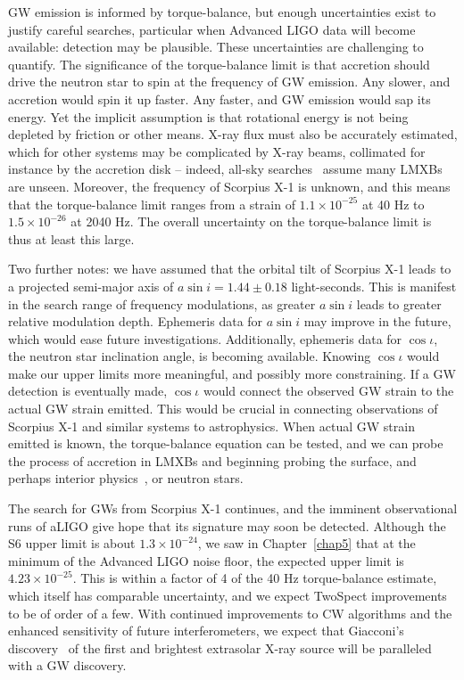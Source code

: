 GW emission is informed by torque-balance, but enough uncertainties exist to justify careful searches, particular when Advanced LIGO data will become available: detection may be plausible.
These uncertainties are challenging to quantify.
The significance of the torque-balance limit is that accretion should drive the neutron star to spin at the frequency of GW emission.
Any slower, and accretion would spin it up faster.
Any faster, and GW emission would sap its energy.
Yet the implicit assumption is that rotational energy is not being depleted by friction or other means.
X-ray flux must also be accurately estimated, which for other systems may be complicated by X-ray beams, collimated for instance by the accretion disk -- indeed, all-sky searches~\cite{GoetzTwoSpectResults2014} assume many LMXBs are unseen.
Moreover, the frequency of Scorpius X-1 is unknown, and this means that the torque-balance limit ranges from a strain of $1.1\times10^{-25}$ at 40 Hz to $1.5\times10^{-26}$ at 2040 Hz.
The overall uncertainty on the torque-balance limit is thus at least this large.

Two further notes: we have assumed that the orbital tilt of Scorpius X-1 leads to a projected semi-major axis of $a \sin i = 1.44 \pm 0.18$ light-seconds.
This is manifest in the search range of frequency modulations, as greater $a \sin i$ leads to greater relative modulation depth.
Ephemeris data for $a \sin i$ may improve in the future, which would ease future investigations.
Additionally, ephemeris data for $\cos \iota$, the neutron star inclination angle, is becoming available.
Knowing $\cos \iota$ would make our upper limits more meaningful, and possibly more constraining.
If a GW detection is eventually made, $\cos \iota$ would connect the observed GW strain to the actual GW strain emitted.
This would be crucial in connecting observations of Scorpius X-1 and similar systems to astrophysics.
When actual GW strain emitted is known, the torque-balance equation can be tested, and we can probe the process of accretion in LMXBs and beginning probing the surface, and perhaps interior physics~\cite{Lindblom1995}, or neutron stars.

The search for GWs from Scorpius X-1 continues, and the imminent observational runs of aLIGO give hope that its signature may soon be detected.
Although the S6 upper limit is about $1.3 \times 10^{-24}$, we saw in Chapter~\ref{chap5} that at the minimum of the Advanced LIGO noise floor, the expected upper limit is $4.23 \times 10^{-25}$. 
This is within a factor of 4 of the 40 Hz torque-balance estimate, which itself has comparable uncertainty, and we expect TwoSpect improvements to be of order of a few.
With continued improvements to CW algorithms and the enhanced sensitivity of future interferometers, we expect that Giacconi's discovery~\cite{Giacconi1962} of the first and brightest extrasolar X-ray source will be paralleled with a GW discovery.


